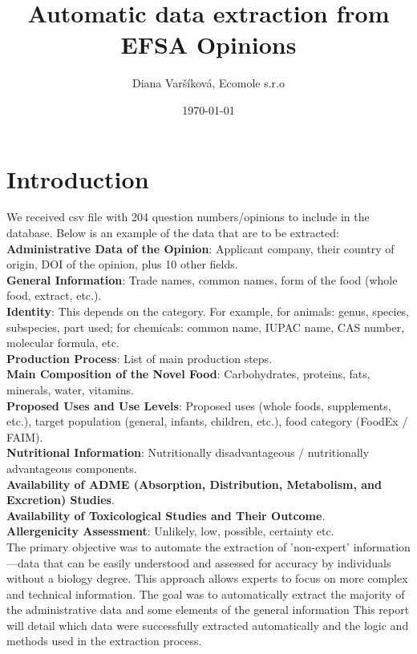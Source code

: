 \documentclass[12pt]{article}
\title{Automatic data extraction from EFSA Opinions}
\author{Diana Varšíková, Ecomole s.r.o}
\date{\today}
\begin{document}
\maketitle

\section{Introduction}
We received csv file with 204 question numbers/opinions to include in the database.
Below is an example of the data that are to be extracted:\\

\textbf{Administrative Data of the Opinion}: Applicant company, their country of origin, DOI of the opinion, plus 10 other fields.\\
\textbf{General Information}: Trade names, common names, form of the food (whole food, extract, etc.).\\
\textbf{Identity}: This depends on the category. For example, for animals: genus, species, subspecies, part used; for chemicals: common name, IUPAC name, CAS number, molecular formula, etc.\\
\textbf{Production Process}: List of main production steps.\\
\textbf{Main Composition of the Novel Food}: Carbohydrates, proteins, fats, minerals, water, vitamins.\\
\textbf{Proposed Uses and Use Levels}: Proposed uses (whole foods, supplements, etc.), target population (general, infants, children, etc.), food category (FoodEx / FAIM).\\
\textbf{Nutritional Information}: Nutritionally disadvantageous / nutritionally advantageous components.\\
\textbf{Availability of ADME (Absorption, Distribution, Metabolism, and Excretion) Studies}.\\
\textbf{Availability of Toxicological Studies and Their Outcome}.\\
\textbf{Allergenicity Assessment}: Unlikely, low, possible, certainty etc.\\

The primary objective was to automate the extraction of 'non-expert' information—data that can be easily understood and assessed for accuracy by individuals without a biology degree.
This approach allows experts to focus on more complex and technical information.
The goal was to automatically extract the majority of the administrative data and some elements of the general information
This report will detail which data were successfully extracted automatically and the logic and methods used in the extraction process.
\end{document}
